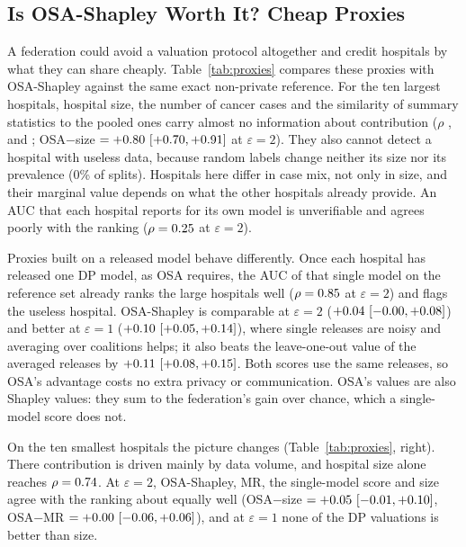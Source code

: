 \subsection{Is OSA-Shapley Worth It? Cheap Proxies}
\label{sec:p19_proxies}
A federation could avoid a valuation protocol altogether and credit hospitals by what they can share cheaply. Table~\ref{tab:proxies} compares these proxies with OSA-Shapley against the same exact non-private reference. For the ten largest hospitals, hospital size, the number of cancer cases and the similarity of summary statistics to the pooled ones carry almost no information about contribution ($\rho$ \pxLSizeNoDP, \pxLPosNoDP{} and \pxLStatNoDP; OSA$-$size $=+0.80\ [+0.70, +0.91]$ at $\varepsilon=2$). They also cannot detect a hospital with useless data, because random labels change neither its size nor its prevalence (0\% of splits). Hospitals here differ in case mix, not only in size, and their marginal value depends on what the other hospitals already provide. An AUC that each hospital reports for its own model is unverifiable and agrees poorly with the ranking ($\rho=0.25$ at $\varepsilon=2$).

Proxies built on a released model behave differently. Once each hospital has released one DP model, as OSA requires, the AUC of that single model on the reference set already ranks the large hospitals well ($\rho=0.85$ at $\varepsilon=2$) and flags the useless hospital. OSA-Shapley is comparable at $\varepsilon=2$ ($+0.04\ [-0.00, +0.08]$) and better at $\varepsilon=1$ ($+0.10\ [+0.05, +0.14]$), where single releases are noisy and averaging over coalitions helps; it also beats the leave-one-out value of the averaged releases by $+0.11\ [+0.08, +0.15]$. Both scores use the same releases, so OSA's advantage costs no extra privacy or communication. OSA's values are also Shapley values: they sum to the federation's gain over chance, which a single-model score does not.

On the ten smallest hospitals the picture changes (Table~\ref{tab:proxies}, right). There contribution is driven mainly by data volume, and hospital size alone reaches $\rho=0.74$. At $\varepsilon=2$, OSA-Shapley, MR, the single-model score and size agree with the ranking about equally well (OSA$-$size $=+0.05\ [-0.01, +0.10]$, OSA$-$MR $=+0.00\ [-0.06, +0.06]$), and at $\varepsilon=1$ none of the DP valuations is better than size.




